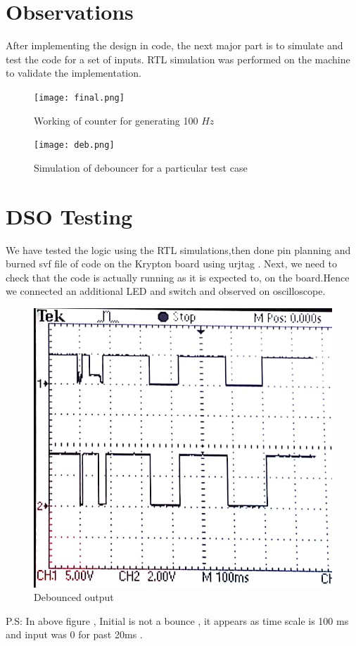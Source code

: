 \documentclass[a4paper, 11pt]{article}
\begin{document}
\section{Observations}
After implementing the design in code, the next major part is to simulate and test the code for a set of inputs. RTL simulation was performed on the machine to validate the implementation.


\begin{figure}[H]
\centering
\texttt{[image: final.png]}
\caption{Working of counter for generating 100 $Hz$}
\end{figure}

\begin{figure}[H]
\centering
\texttt{[image: deb.png]}
\caption{Simulation of debouncer for a particular test case}
\end{figure}


\section{DSO Testing}

We have tested the logic using the RTL simulations,then done pin planning and burned svf file of code on the Krypton board using urjtag . Next, we need to check that the code is actually running as it is expected to, on the board.Hence we connected an additional LED and switch and observed on oscilloscope.


\begin{figure}[H]
\centering
\includegraphics[width=12cm]{dso.jpg}
\caption{Debounced output}
\end{figure}
P.S: In above figure , Initial is not a bounce , it appears as time scale is 100 ms and input was 0 for past 20ms .
\end{document}
